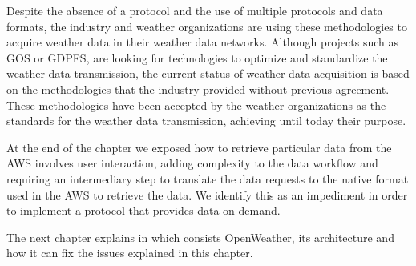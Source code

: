 Despite the absence of a protocol and the use of multiple protocols and data formats, the industry and weather organizations are using these methodologies to acquire weather data in their weather data networks.  Although projects such as \gls{GOS} or \gls{GDPFS},  are looking for technologies to optimize and standardize the weather data transmission, the current status of weather data acquisition is based on the methodologies that the industry provided without previous agreement. These methodologies have been accepted by the weather organizations as the standards for the weather data transmission, achieving until today their purpose.

At the end of the chapter we exposed how to retrieve particular data from the \gls{AWS} involves user interaction, adding complexity to the data workflow and requiring an intermediary step to translate the data requests to the native format used in the \gls{AWS} to retrieve the data. We identify this as an impediment in order to implement a protocol that provides data on demand.

The next chapter explains in which consists OpenWeather, its architecture and how it can fix the issues explained in this chapter.
\pagebreak
